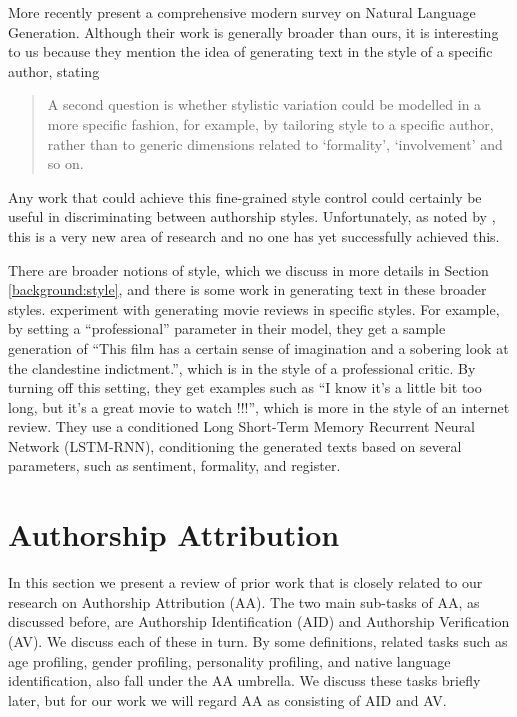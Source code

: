 More recently \citet{gatt2017survey} present a comprehensive modern survey on Natural Language Generation. Although their work is generally broader than ours, it is interesting to us because they mention the idea of generating text in the style of a specific author, stating 

\begin{quote}
A second question is whether stylistic variation could be modelled in a more specific fashion, for example, by tailoring style to a specific author, rather than to generic dimensions related to ‘formality’,  ‘involvement’ and so on.  
\end{quote}

Any work that could achieve this fine-grained style control could certainly be useful in discriminating between authorship styles. Unfortunately, as noted by \citeauthor{gatt2017survey}, this is a very new area of research and no one has yet successfully achieved this.

There are broader notions of style, which we discuss in more details in Section \ref{background:style}, and there is some work in generating text in these broader styles. \citet{ficler2017controlling} experiment with generating movie reviews in specific styles. For example, by setting a ``professional'' parameter in their model, they get a sample generation of ``This film has a certain sense of imagination and a sobering look at the clandestine indictment.'', which is in the style of a professional critic. By turning off this setting, they get examples such as ``I know it’s a little bit too long, but it’s a great movie to watch !!!'', which is more in the style of an internet review. They use a conditioned Long Short-Term Memory Recurrent Neural Network (LSTM-RNN), conditioning the generated texts based on several parameters, such as sentiment, formality, and register.

\section{Authorship Attribution}\label{authorship-attribution}

In this section we present a review of prior work that is closely related to our research on Authorship Attribution (AA). The two main sub-tasks of AA, as discussed before, are Authorship Identification (AID) and Authorship Verification (AV). We discuss each of these in turn. By some definitions, related tasks such as age profiling, gender profiling, personality profiling, and native language identification, also fall under the AA umbrella. We discuss these tasks briefly later, but for our work we will regard AA as consisting of AID and AV.

